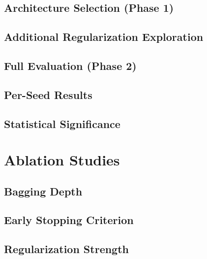 \documentclass[sigconf,nonacm]{acmart}
\begin{document}
\subsection{Architecture Selection (Phase 1)}

\subsection{Additional Regularization Exploration}

\subsection{Full Evaluation (Phase 2)}

\subsection{Per-Seed Results}

\subsection{Statistical Significance}


\section{Ablation Studies}
\label{sec:ablation}

\subsection{Bagging Depth}

\subsection{Early Stopping Criterion}

\subsection{Regularization Strength}
\end{document}
